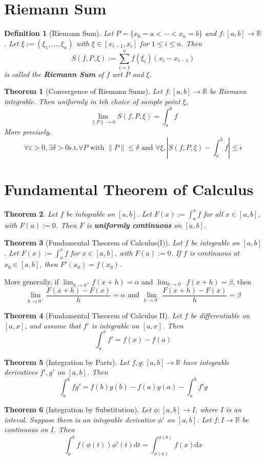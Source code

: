 \documentclass[12pt]{article}
\newcommand{\diff}{\mathrm{d}}
\newtheorem{definition}{Definition}[section]
\newtheorem{theorem}{Theorem}[section]
\theoremstyle{definition}
\begin{document}
\section{Riemann Sum}
\begin{definition}[Riemann Sum]
\normalfont Let $P=\{x_0=a<\cdots <x_n=b\}$ and $f:[a,b]\to\mathbb{R}$. Let $\xi:=(\xi_1,\ldots, \xi_n)$ with $\xi\in[x_{i-1},x_i]$ for $1\leq i\leq n$. Then
\[
S(f,P,\xi):=\sum_{i=1}^n f(\xi_i)(x_i-x_{i-1})
\]
is called the \textbf{Riemann Sum} of $f$ wrt $P$ and $\xi$.
\end{definition}
\begin{theorem}[Convergence of Riemann Sums]
\normalfont Let $f:[a,b]\to\mathbb{R}$ be Riemann integrable. Then uniformly in teh choice of sample point $\xi$, 
\[
\lim_{\|P\|\to 0}S(f,P,\xi)=\int_a^b f
\]
More precisely,
\[
\forall \varepsilon>0, \exists \delta>0 \text{s.t.} \forall P \text{ with }\|P\|\leq \delta\text{ and }\forall \xi, |S(f,P,\xi)-\int_a^b f|\leq \epsilon
\]
\end{theorem}
\section{Fundamental Theorem of Calculus}
\begin{theorem}
\normalfont Let $f$ be integrable on $[a,b]$. Let $F(x):=\int_a^x f$ for all $x\in[a,b]$, with $F(a):=0$. Then $F$ is \textbf{uniformly continuous} on $[a,b]$.
\end{theorem}
\begin{theorem}[Fundamental Theorem of Calculus(I)]
\normalfont Let $f$ be integrable on $[a,b]$. Let $F(x):=\int_a^xf$ for $x\in[a,b]$, with $F(a):=0$. If $f$ is continuous at $x_0\in[a,b]$, then $F'(x_0)=f(x_0)$.
\end{theorem}
More generally, if $\lim_{h\to 0^{+}} f(x+h)=\alpha$ and $\lim_{h\to 0^{-}} f(x+h)=\beta$, then
\[
\lim_{h\to 0^{+}} \frac{F(x+h)-F(x)}{h}=\alpha\text{  and }\lim_{h\to 0^{-}} \frac{F(x+h)-F(x)}{h}=\beta
\]
\begin{theorem}[Fundamental Theorem of Calculus II]
\normalfont Let $f$ be differentiable on $[a,x]$, and assume that $f'$ is integrable on $[a,x]$. Then 
\[
\int_a^x f' = f(x)-f(a)
\]
\end{theorem}
\begin{theorem}[Integration by Parts]
\normalfont Let $f,g:[a,b]\to\mathbb{R}$ have integrable derivatives $f', g'$ on $[a,b]$. Then
\[
\int_a^b fg' = f(b)g(b)-f(a)g(a)-\int_a^b f'g
\]
\end{theorem}
\begin{theorem}[Integration by Substitution]
\normalfont Let $\phi:[a,b]\to I$, where $I$ is an inteval. Suppose there is an integrable derivative $\phi'$ on $[a,b]$. Let $f:I\to\mathbb{R}$ be continuous on $I$. Then
\[
\int_a^b f(\phi(t))\phi'(t)\diff t = \int_{\phi(a)}^{\phi(b)} f(x)\diff x
\]
\end{theorem}
\end{document}

